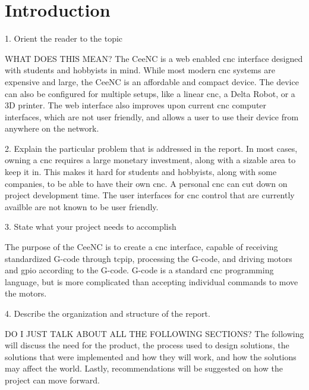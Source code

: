 \chapter{Introduction}
1. Orient the reader to the topic

WHAT DOES THIS MEAN?
The CeeNC is a web enabled \gls{cnc} interface designed with students and hobbyists in mind. 
While most modern \gls{cnc} systems are expensive and large, the CeeNC is an affordable and compact device. 
The device can also be configured for multiple setups, like a linear \gls{cnc}, a Delta Robot, or a 3D printer. 
The web interface also improves upon current \gls{cnc} computer interfaces, which are not user friendly, and allows a user to use their device from anywhere on the network.


2. Explain the particular problem that is addressed in the report.	
In most cases, owning a \gls{cnc} requires a large monetary investment, along with a sizable area to keep it in. 
This makes it hard for students and hobbyists, along with some companies, to be able to have their own \gls{cnc}.
A personal \gls{cnc} can cut down on project development time.
The user interfaces for \gls{cnc} control that are currently availble are not known to be user friendly.

3. State what your project needs to accomplish

The purpose of the CeeNC is to create a \gls{cnc} interface, capable of receiving standardized G-code through \gls{tcpip}, processing the G-code, and driving motors and \gls{gpio} according to the G-code. 
G-code is a standard \gls{cnc} programming language, but is more complicated than accepting individual commands to move the motors.


4. Describe the organization and structure of the report.

DO I JUST TALK ABOUT ALL THE FOLLOWING SECTIONS?
The following will discuss the need for the product, the process used to design solutions, the solutions that were implemented and how they will work, and how the solutions may affect the world.
Lastly, recommendations will be suggested on how the project can move forward.
